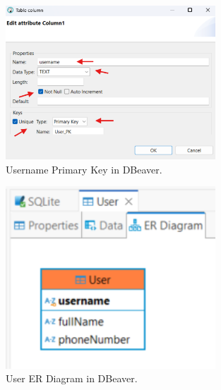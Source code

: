 \documentclass[a4paper,11pt,oneside]{article}
\begin{document}
\begin{sloppypar}
\begin{figure}[!htb]
  \centering
  \includegraphics[width=0.7\textwidth]{dbeaver/username_primary_key.png}
  \caption{Username Primary Key in DBeaver.}
  \label{fig:username_primary_key}
\end{figure}

\begin{figure}[!htb]
  \centering
  \includegraphics[width=0.7\textwidth]{dbeaver/user_er_diagram.png}
  \caption{User ER Diagram in DBeaver.}
  \label{fig:user_er_diagram}
\end{figure}



\end{sloppypar}
\end{document}
